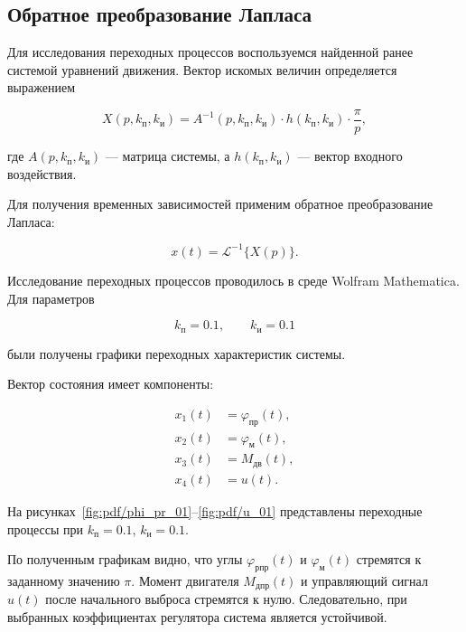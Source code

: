 \subsection{Обратное преобразование Лапласа}

Для исследования переходных процессов воспользуемся найденной ранее системой уравнений движения. Вектор искомых величин определяется выражением

\begin{equation}
    X(p, k_{\text{п}}, k_{\text{и}})
    =
    A^{-1}(p, k_{\text{п}}, k_{\text{и}})
    \cdot
    h(k_{\text{п}}, k_{\text{и}})
    \cdot
    \frac{\pi}{p},
\end{equation}

где $A(p,k_{\text{п}},k_{\text{и}})$ --- матрица системы, а
$h(k_{\text{п}},k_{\text{и}})$ --- вектор входного воздействия.

Для получения временных зависимостей применим обратное преобразование Лапласа:

\begin{equation}
    x(t)
    =
    \mathcal{L}^{-1}\{X(p)\}.
\end{equation}

Исследование переходных процессов проводилось в среде Wolfram Mathematica. Для параметров

\[
    k_{\text{п}} = 0.1,
    \qquad
    k_{\text{и}} = 0.1
\]

были получены графики переходных характеристик системы.

Вектор состояния имеет компоненты:

\[
\begin{aligned}
    x_1(t) &= \varphi_{\text{пр}}(t), \\
    x_2(t) &= \varphi_{\text{м}}(t), \\
    x_3(t) &= M_{\text{дв}}(t), \\
    x_4(t) &= u(t).
\end{aligned}
\]

На рисунках~\ref{fig:pdf/phi_pr_01}--\ref{fig:pdf/u_01} представлены переходные процессы при $k_{\text{п}}=0.1$, $k_{\text{и}}=0.1$.





По полученным графикам видно, что углы $\varphi_{\text{рпр}}(t)$ и $\varphi_{\text{м}}(t)$ стремятся к заданному значению $\pi$. Момент двигателя $M_{\text{дпр}}(t)$ и управляющий сигнал $u(t)$ после начального выброса стремятся к нулю. Следовательно, при выбранных коэффициентах регулятора система является устойчивой.

